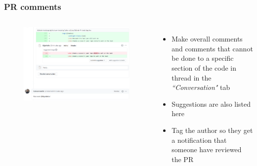 \documentclass[aspectratio=169]{beamer} %
\begin{document}
\begin{frame}
	\frametitle{PR comments}
	\begin{columns}[c]
		
		\vspace{-.75cm}
		\begin{figure}
			\centering
			\includegraphics[width=\textwidth]{./img/pr-comment.png}
		\end{figure}	
		
		\begin{itemize}
			\setlength\itemsep{1em}
			\item Make overall comments and comments that cannot be done to a specific section of the code in thread in the \textit{``Conversation"} tab
			\item Suggestions are also listed here
			\item Tag the author so they get a notification that someone have reviewed the PR
		\end{itemize}
		
	\end{columns}
\end{frame}
\end{document}
